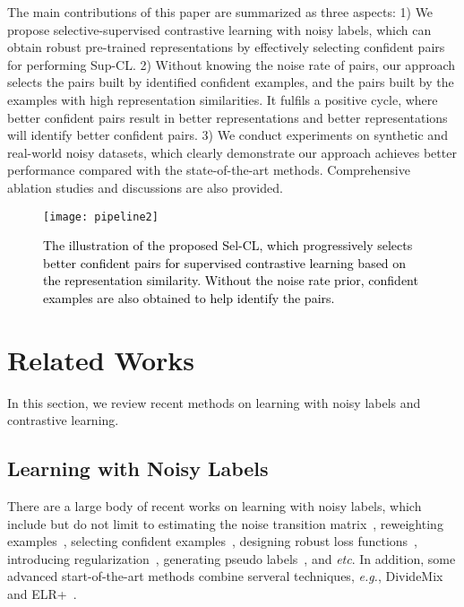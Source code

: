 \documentclass[10pt,twocolumn,letterpaper]{article}
\begin{document}
The main contributions of this paper are summarized as three aspects:
1) We propose selective-supervised contrastive learning with noisy labels, which can obtain robust pre-trained representations by effectively selecting confident pairs for performing Sup-CL.
2) Without knowing the noise rate of pairs, our approach selects the pairs built by identified confident examples, and the pairs built by the examples with high representation similarities. It fulfils a positive cycle, where better confident pairs result in better representations and better representations will identify better confident pairs. 
3) We conduct experiments on synthetic and real-world noisy datasets, which clearly demonstrate our approach achieves better performance compared with the state-of-the-art methods. Comprehensive ablation studies and discussions are also provided. 



\begin{figure*}
	\centering
	\texttt{[image: pipeline2]}
	\caption{\textcolor{black}{The illustration of the proposed Sel-CL, which progressively selects better confident pairs  for supervised contrastive learning based on the representation similarity. Without the noise rate prior, confident examples  are also obtained to help identify the pairs.}}
	\label{fig:pipeline}
\end{figure*}

\section{Related Works}\label{sec:2}
In this section, we review recent methods on learning with noisy labels and contrastive learning. 

\subsection{Learning with Noisy Labels}
There are a large body of recent works on learning with noisy labels, which include but do not limit to estimating the noise transition
matrix~\cite{HendrycksMWG18,xia2019anchor,xia2020part,cheng2022cvpr}, reweighting examples~\cite{Liu2016TPAMI,RenZYU18,ShuXY0ZXM19,wang2021graph}, selecting confident examples~\cite{huang2019o2u,YangICML2020,chen2022anomman,Li2020aaai}, designing robust loss functions~\cite{zhang2018generalized,GhoshKS17,ChengZLGSL21,wei2021robust}, introducing regularization~\cite{zhang2018mixup,hu2020simple,chen2021noise}, generating pseudo labels~\cite{tanaka2018joint,zheng2020error,zhang2021learningwith,han2019deep,Li2021TMM}, and \textit{etc}. In addition, some advanced start-of-the-art methods combine serveral techniques, \textit{e.g.}, DivideMix~\cite{LiSH20} and ELR+~\cite{LiuNRF20}.
\end{document}
